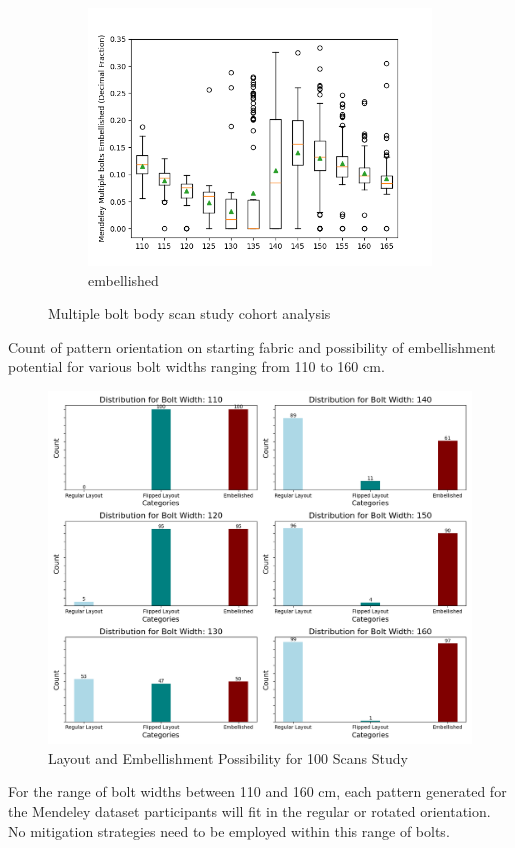 \begin{figure}[H]
    \vfill
    \begin{subfigure}[b]{0.45\textwidth}
        \centering
        \includegraphics[width=\textwidth]{Images/Mendeley Multiple bolts Embellished_Boxplot.png}
        \caption{embellished}
        \label{multibolt_embellished}
    \end{subfigure}
    \caption{Multiple bolt body scan study cohort analysis}
    \label{fig:multibolt_analysis}
\end{figure}

Count of pattern orientation on starting fabric and possibility of embellishment potential for various bolt widths ranging from 110 to 160 cm.
\begin{figure} [H]
    \centering
    \includegraphics[width = \textwidth]{Images/Mendeley_Bar.png}
    \caption{Layout and Embellishment Possibility for 100 Scans Study}
\end{figure}
For the range of bolt widths between 110 and 160 cm, each pattern generated for the Mendeley dataset participants will fit in the regular or rotated orientation. No mitigation strategies need to be employed within this range of bolts.


